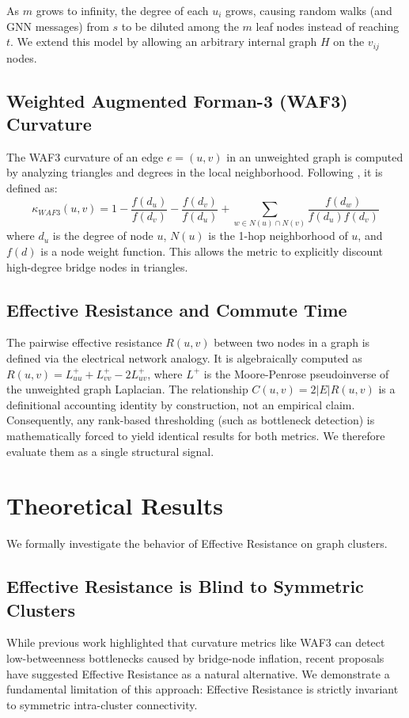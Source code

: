 \documentclass[10pt]{article} %
\begin{document}
As $m$ grows to infinity, the degree of each $u_i$ grows, causing random walks (and GNN messages) from $s$ to be diluted among the $m$ leaf nodes instead of reaching $t$. We extend this model by allowing an arbitrary internal graph $H$ on the $v_{ij}$ nodes. 

\subsection{Weighted Augmented Forman-3 (WAF3) Curvature}
The WAF3 curvature of an edge $e = (u,v)$ in an unweighted graph is computed by analyzing triangles and degrees in the local neighborhood. Following \citet{Chen2026}, it is defined as:
\begin{equation}
\kappa_{WAF3}(u,v) = 1 - \frac{f(d_u)}{f(d_v)} - \frac{f(d_v)}{f(d_u)} + \sum_{w \in N(u) \cap N(v)} \frac{f(d_w)}{f(d_u) f(d_v)}
\end{equation}
where $d_u$ is the degree of node $u$, $N(u)$ is the 1-hop neighborhood of $u$, and $f(d)$ is a node weight function. This allows the metric to explicitly discount high-degree bridge nodes in triangles.

\subsection{Effective Resistance and Commute Time}
The pairwise effective resistance $R(u,v)$ between two nodes in a graph is defined via the electrical network analogy. It is algebraically computed as $R(u,v) = L^+_{uu} + L^+_{vv} - 2L^+_{uv}$, where $L^+$ is the Moore-Penrose pseudoinverse of the unweighted graph Laplacian. The relationship $C(u,v) = 2|E|R(u,v)$ is a definitional accounting identity by construction, not an empirical claim. Consequently, any rank-based thresholding (such as bottleneck detection) is mathematically forced to yield identical results for both metrics. We therefore evaluate them as a single structural signal.

\section{Theoretical Results}
We formally investigate the behavior of Effective Resistance on graph clusters.
\subsection{Effective Resistance is Blind to Symmetric Clusters}

While previous work highlighted that curvature metrics like WAF3 can detect low-betweenness bottlenecks caused by bridge-node inflation, recent proposals have suggested Effective Resistance as a natural alternative. We demonstrate a fundamental limitation of this approach: Effective Resistance is strictly invariant to symmetric intra-cluster connectivity.
\end{document}
